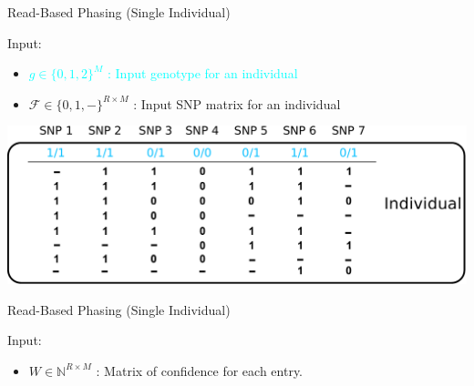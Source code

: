 \documentclass[notes=hide]{beamer}
\newcommand{\F}{\mathcal{F}}
\newcommand{\RR}{\mathbb{N}}
\begin{document}
\begin{frame}{Read-Based Phasing (Single Individual)}
\begin{center}
\begin{block}{Input: }
				\begin{itemize}
										\item \textcolor{cyan}{$g \in \{0,1,2\}^M$ : Input genotype for an individual }
					\item $\F \in \{0,1,-\}^{R\times M}$ : Input SNP matrix for an individual 

				\end{itemize}
	\end{block}
	\bigskip
	\includegraphics[scale=0.35]{figs/sih-phasing-complete-matrix.pdf}%
\end{center}
\end{frame}

\begin{frame}{Read-Based Phasing (Single Individual)}
	\begin{center}
\begin{block}{Input:}
		\begin{itemize}
		\color{blue}	\item $W \in \RR^{R \times M}$ : Matrix of confidence for each entry.

		\end{itemize}
	\end{block}
		\bigskip
		\bigskip
         \vspace*{1.9mm}
\end{center}
\end{frame}
\end{document}

